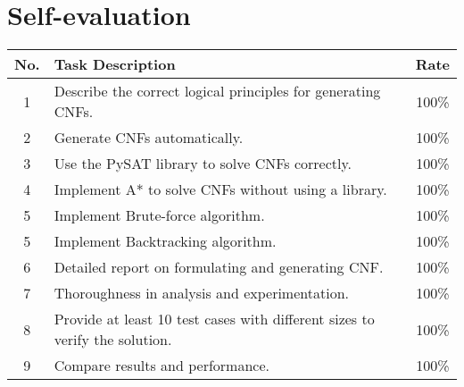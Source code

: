 \section{Self-evaluation}
\begin{center}
  \renewcommand{\arraystretch}{1.5}
  \begin{tabular}{|c|p{}|c|}
    \hline
    \textbf{No.} & \textbf{Task Description}                                                   & \textbf{Rate} \\\hline
    1            & Describe the correct logical principles for generating CNFs.                & 100\%         \\\hline
    2            & Generate CNFs automatically.                                                & 100\%         \\\hline
    3            & Use the PySAT library to solve CNFs correctly.                              & 100\%         \\\hline
    4            & Implement A* to solve CNFs without using a library.                         & 100\%         \\\hline
    5            & Implement Brute-force algorithm.                                            & 100\%         \\\hline
    5            & Implement Backtracking algorithm.                                           & 100\%         \\\hline
    6            & Detailed report on formulating and generating CNF\@.                        & 100\%         \\\hline
    7            & Thoroughness in analysis and experimentation.                               & 100\%         \\\hline
    8            & Provide at least 10 test cases with different sizes to verify the solution. & 100\%         \\\hline
    9            & Compare results and performance.                                            & 100\%         \\\hline
  \end{tabular}
\end{center}
